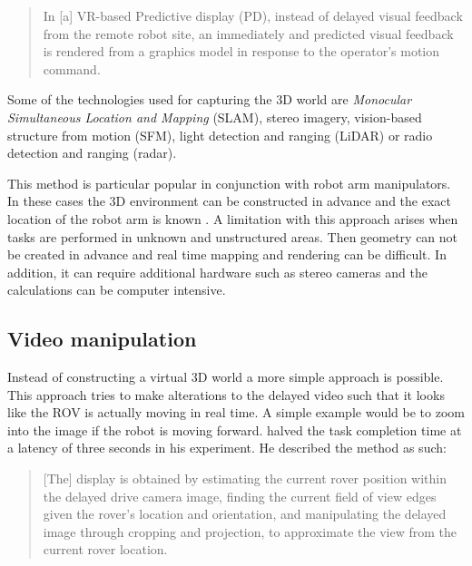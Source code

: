 \begin{quote}
\small In [a] VR-based Predictive display (PD), instead of delayed visual feedback from the remote robot site, an immediately and predicted visual feedback is rendered from a graphics model in response to the operator's motion command.
\end{quote}


Some of the technologies used for capturing the 3D world are \textit{Monocular Simultaneous Location and Mapping} (SLAM), stereo imagery, vision-based structure from motion (SFM), light detection and ranging (LiDAR) or radio detection and ranging (radar).

This method is particular popular in conjunction with robot arm manipulators. In these cases the 3D environment can be constructed in advance and the exact location of the robot arm is known \citep{Ricks2004}. A limitation with this approach arises when tasks are performed in unknown and unstructured areas. Then geometry can not be created in advance and real time mapping and rendering can be difficult. In addition, it can require additional hardware such as stereo cameras and the calculations can be computer intensive.



\subsection{Video manipulation}

Instead of constructing a virtual 3D world a more simple approach is possible. This approach tries to make alterations to the delayed video such that it looks like the ROV is actually moving in real time. A simple example would be to zoom into the image if the robot is moving forward. \citet{Matheson2013} halved the task completion time at a latency of three seconds in his experiment. He described the method as such:

\begin{quote}
\small [The] display is obtained by estimating the current rover position within the delayed drive camera image, finding the current field of view edges given the rover’s location and orientation, and manipulating the delayed image through cropping and projection, to approximate the view from the current rover location.
\end{quote}

